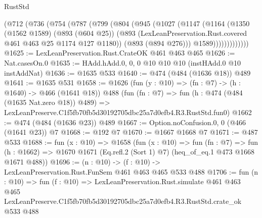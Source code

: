 \begin{lexlean}{RustStd}
\begin{coremodule}
          (@712
            (@736
              (@754
                (@787
                  (@799
                    (@804
                      (@945
                        (@1027
                          (@1147
                            (@1164
                              (@1350
                                (@1562 @1589)
                                (@893 (@604 @25))
                                (@893
                                  (LexLeanPreservation.Rust.covered @461 @463 @25 @1174 @127 @1180))
                                (@893 (@894 @276)))
                              @1589)))))))))))))
@1625 := LexLeanPreservation.Rust.CrateOK @461 @463 @465
@1626 := Nat.casesOn.{0}
@1635 := HAdd.hAdd.{0, 0, 0} @10 @10 @10 (instHAdd.{0} @10 instAddNat)
@1636 := @1635 @533
@1640 := @474 (@484 (@1636 @18)) @489
@1641 := @1635 @531
@1658 := @1626
    (fun (y : @10) => (fn : @7) -> (h : @1640) -> @466 (@1641 @18))
    @488
    (fun (fn : @7) =>
    fun (h : @474 (@484 (@1635 Nat.zero @18)) @489) =>
    LexLeanPreserve.C1f5fb70fb5d30192705dbc25a7d0efb4.R3.RustStd.fun0)
@1662 := @474 (@484 (@1636 @23)) @489
@1667 := Option.noConfusion.{0, 0} (@466 (@1641 @23)) @7
@1668 := @192 @7
@1670 := @1667 @1668 @7
@1671 := @487 @533
@1688 := fun (x : @10) =>
  @1658
    (fun (x : @10) =>
    fun (fn : @7) =>
    fun (h : @1662) => @1670 @1671 (Eq.refl.{2} (Sort 1) @7) (heq_of_eq.{1} @473 @1668 @1671 @488))
@1696 := (n : @10) -> (f : @10) -> LexLeanPreservation.Rust.FunSem @461 @463 @465 @533 @488
@1706 := fun (n : @10) =>
  fun (f : @10) =>
  LexLeanPreservation.Rust.simulate
    @461
    @463
    @465
    LexLeanPreserve.C1f5fb70fb5d30192705dbc25a7d0efb4.R3.RustStd.crate_ok
    @533
    @488
\end{coremodule}
\end{lexlean}
